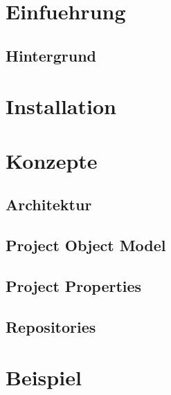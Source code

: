 \section{Einfuehrung}
\subsection{Hintergrund}

\section{Installation}
\section{Konzepte}
\subsection{Architektur}
\subsection[POM]{Project Object Model}
\subsection[PP]{Project Properties}
\subsection{Repositories}

\section{Beispiel}

